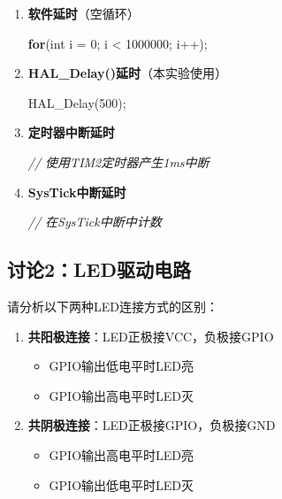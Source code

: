 \documentclass[
  chinese,
  UTF8,
  oneside,
  openany]{ctexbook}
\newenvironment{Shaded}{}{}
\newcommand{\CommentTok}[1]{\textcolor[rgb]{0.38,0.63,0.69}{\textit{#1}}}
\newcommand{\ControlFlowTok}[1]{\textcolor[rgb]{0.00,0.44,0.13}{\textbf{#1}}}
\newcommand{\DataTypeTok}[1]{\textcolor[rgb]{0.56,0.13,0.00}{#1}}
\newcommand{\DecValTok}[1]{\textcolor[rgb]{0.25,0.63,0.44}{#1}}
\newcommand{\NormalTok}[1]{#1}
\newcommand{\OperatorTok}[1]{\textcolor[rgb]{0.40,0.40,0.40}{#1}}
\providecommand{\tightlist}{%
  \setlength{\itemsep}{0pt}\setlength{\parskip}{0pt}}
\begin{document}
\begin{enumerate}
\def\labelenumi{\arabic{enumi}.}
\item
  \textbf{软件延时}（空循环）

\begin{Shaded}
\begin{Highlighting}[]
\ControlFlowTok{for}\OperatorTok{(}\DataTypeTok{int}\NormalTok{ i }\OperatorTok{=} \DecValTok{0}\OperatorTok{;}\NormalTok{ i }\OperatorTok{\textless{}} \DecValTok{1000000}\OperatorTok{;}\NormalTok{ i}\OperatorTok{++);}
\end{Highlighting}
\end{Shaded}
\item
  \textbf{HAL\_Delay()延时}（本实验使用）

\begin{Shaded}
\begin{Highlighting}[]
\NormalTok{HAL\_Delay}\OperatorTok{(}\DecValTok{500}\OperatorTok{);}
\end{Highlighting}
\end{Shaded}
\item
  \textbf{定时器中断延时}

\begin{Shaded}
\begin{Highlighting}[]
\CommentTok{// 使用TIM2定时器产生1ms中断}
\end{Highlighting}
\end{Shaded}
\item
  \textbf{SysTick中断延时}

\begin{Shaded}
\begin{Highlighting}[]
\CommentTok{// 在SysTick中断中计数}
\end{Highlighting}
\end{Shaded}
\end{enumerate}

\subsection{讨论2：LED驱动电路}\label{ux8ba8ux8bba2ledux9a71ux52a8ux7535ux8def}

请分析以下两种LED连接方式的区别：

\begin{enumerate}
\def\labelenumi{\arabic{enumi}.}
\tightlist
\item
  \textbf{共阳极连接}：LED正极接VCC，负极接GPIO

  \begin{itemize}
  \tightlist
  \item
    GPIO输出低电平时LED亮
  \item
    GPIO输出高电平时LED灭
  \end{itemize}
\item
  \textbf{共阴极连接}：LED正极接GPIO，负极接GND

  \begin{itemize}
  \tightlist
  \item
    GPIO输出高电平时LED亮
  \item
    GPIO输出低电平时LED灭
  \end{itemize}
\end{enumerate}
\end{document}

